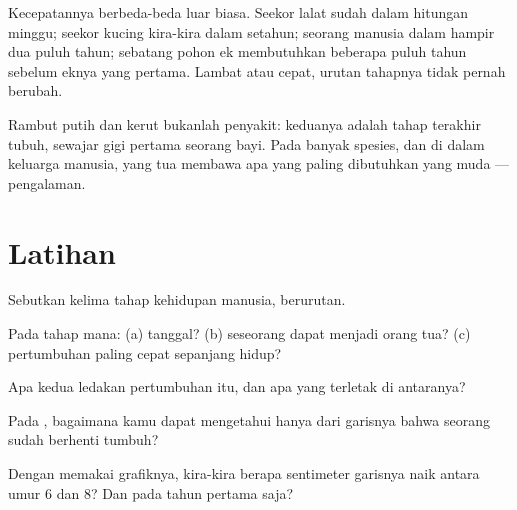 \begin{example}\label{ex:g3:stages-of-life:speeds}
Kecepatannya berbeda-beda luar biasa. Seekor lalat sudah  dalam
hitungan minggu; seekor kucing kira-kira dalam setahun; seorang
manusia dalam hampir dua puluh tahun; sebatang pohon ek membutuhkan
beberapa puluh tahun sebelum  eknya yang pertama. Lambat atau
cepat, urutan tahapnya tidak pernah berubah.
\end{example}

\begin{remark}\label{rem:g3:stages-of-life:oldage}
Rambut putih dan kerut bukanlah penyakit: keduanya adalah tahap
terakhir tubuh, sewajar gigi pertama seorang bayi. Pada banyak spesies,
dan di dalam keluarga manusia, yang tua membawa apa yang paling
dibutuhkan yang muda --- pengalaman.
\end{remark}

\section{Latihan}

\begin{exercise}[$\star$]\label{exo:g3:stages-of-life:1}
Sebutkan kelima tahap kehidupan manusia, berurutan.
\end{exercise}

\begin{exercise}[$\star$]\label{exo:g3:stages-of-life:2}
Pada tahap mana: (a)  tanggal? (b) seseorang dapat menjadi
orang tua? (c) pertumbuhan paling cepat sepanjang hidup?
\end{exercise}

\begin{exercise}[$\star$]\label{exo:g3:stages-of-life:3}
Apa kedua ledakan pertumbuhan itu, dan apa yang terletak di antaranya?
\end{exercise}

\begin{exercise}[$\star$]\label{exo:g3:stages-of-life:4}
Pada , bagaimana kamu dapat mengetahui hanya dari
garisnya bahwa seorang  sudah berhenti tumbuh?
\end{exercise}

\begin{exercise}[$\star$]\label{exo:g3:stages-of-life:5}
Dengan memakai grafiknya, kira-kira berapa sentimeter garisnya naik
antara umur $6$ dan $8$? Dan pada tahun pertama saja?
\end{exercise}

